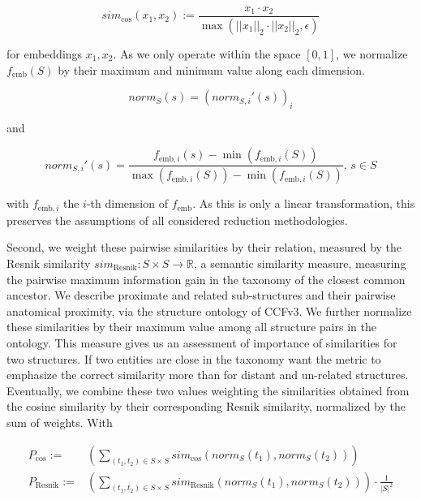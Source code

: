 \documentclass[]{article}
\renewcommand{\cite}{\citep}
\begin{document}
\begin{equation}
	sim_\text{cos}(x_1,x_2):=\frac{x_1\cdot x_2}{\max\left( ||x_1||_2 \cdot ||x_2||_2,\epsilon \right)}
\end{equation}

for embeddings $x_1, x_2$. As we only operate within the space $[0,1]$, we normalize $f_{\text{emb}}(S)$ by their maximum and minimum value along each dimension. 

\begin{equation}
	\label{equ:norm}
	norm_S(s) = \left( norm_{S,i}'(s) \right)_i
\end{equation}

and

\begin{equation}
	norm_{S,i}'(s)=\frac{f_{\text{emb},i}(s) - \min\left(f_{\text{emb},i}(S) \right)}{\max\left(f_{\text{emb},i}(S) \right) - \min\left(f_{\text{emb},i}(S) \right)} \text{,  }s\in S
\end{equation}

with $f_{\text{emb},i}$ the $i$-th dimension of $f_{\text{emb}}$. As this is only a linear transformation, this preserves the assumptions of all considered reduction methodologies.

Second, we weight these pairwise similarities by their relation, measured by the Resnik similarity \cite{resnik1995using} $sim_\text{Resnik}:S\times S\rightarrow \mathbb{R}$, a semantic similarity measure, measuring the pairwise maximum information gain in the taxonomy of the closest common ancestor. We describe proximate and related sub-structures and their pairwise anatomical proximity, via the structure ontology of CCFv3.
We further normalize these similarities by their maximum value among all structure pairs in the ontology. This measure gives us an assessment of importance of similarities for two structures. If two entities are close in the taxonomy want the metric to emphasize the correct similarity more than for distant and un-related structures.\\

Eventually, we combine these two values weighting the similarities obtained from the cosine similarity by their corresponding Resnik similarity, normalized by the sum of weights. With 

\begin{align}
	P_{\text{cos}}:=&\left( \sum_{(t_1,t_2)\in S\times S}sim_\text{cos} (norm_S(t_1), norm_S(t_2)) \right)\\
	P_{\text{Resnik}}:=&\left( \sum_{(t_1,t_2)\in S\times S}sim_\text{Resnik} (norm_S(t_1), norm_S(t_2)) \right) \cdot \frac{1}{|S|^2}
\end{align}
\end{document}
